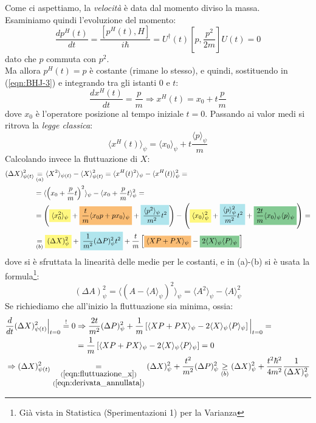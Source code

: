 \documentclass[../../FisicaTeorica.tex]{subfiles}
\begin{document}
Come ci aspettiamo, la \textit{velocità} è data dal momento diviso la massa.\\
Esaminiamo quindi l'evoluzione del momento:
\[
\frac{dp^H(t)}{dt}=\frac{[p^H(t),H]}{i\hbar}=U^\dag(t)\left[p,\frac{p^2}{2m}\right]U(t)=0
\]
dato che $p$ commuta con $p^2$.\\
Ma allora $p^H(t)=p$ è costante (rimane lo stesso), e quindi, sostituendo in (\ref{eqn:BHJ-3}) e integrando tra gli istanti $0$ e $t$:
\[
\frac{dx^H(t)}{dt}=\frac{p}{m}\Rightarrow x^H(t)=x_0+t\frac{p}{m}
\]
dove $x_0$ è l'operatore posizione al tempo iniziale $t=0$. Passando ai valor medi si ritrova la \textit{legge classica}:
\[
\langle x^H(t)\rangle_\psi = \langle x_0\rangle_\psi + t \frac{\langle p\rangle_\psi}{m}
\]
Calcolando invece la fluttuazione di $X$:
\begin{align}
\nonumber
(\Delta X)^2_{\psi(t)} &\underset{(a)}{=} \langle X^2\rangle_{\psi(t)}-\langle X\rangle_{\psi(t)}^2 =\langle x^H(t)^2\rangle_\psi-\langle x^H(t)\rangle_\psi^2 =\\
&=\langle \left(x_0+\frac{p}{m}t\right)^2\rangle_\psi-\langle x_0+\frac{p}{m}t\rangle^2_\psi =\nonumber \\
&= \nonumber
\left(
\hlc{Yellow}{\langle x_0^2\rangle_\psi} + \hlc{BurntOrange}{\frac{t}{m}\langle x_0p + px_0\rangle_\psi} 
+ \hlc{SkyBlue}{\frac{\langle p^2 \rangle_\psi}{m^2} t^2} \right)
-\left(
\hlc{Yellow}{\langle x_0\rangle_\psi^2} + \hlc{SkyBlue}{\frac{\langle p\rangle_\psi^2}{m^2}t^2} 
+ \hlc{ForestGreen}{\frac{2t}{m}\langle x_0\rangle_\psi\langle p\rangle_\psi}\right) =\\
&\underset{(b)}{=} \hlc{Yellow}{(\Delta X)^2_\psi} + \hlc{SkyBlue}{\frac{1}{m^2}(\Delta P)^2_\psi t^2} +
\frac{t}{m}\left [\hlc{BurntOrange}{\langle XP+PX\rangle_\psi}-\hlc{ForestGreen}{2\langle X\rangle_\psi\langle P\rangle_\psi}\right ]
\label{eqn:fluttuazione_x}
\end{align}
dove si è sfruttata la linearità delle medie per  le costanti, e in (a)-(b) si è usata la formula\footnote{Già vista in Statistica (Sperimentazioni 1) per la Varianza}:
\[
(\Delta A)^2_\psi = \langle(A-\langle A\rangle_\psi)^2\rangle_\psi =\langle A^2\rangle_\psi-\langle A\rangle_\psi^2
\]
Se richiediamo che all'inizio la fluttuazione sia minima, ossia:
\begin{align}
\frac{d}{dt}(\Delta X)^2_{\psi(t)}\Big|_{t=0}\overset{!}{=}0 &\Rightarrow 
\frac{2t}{m^2}(\Delta P)^2_\psi + \frac{1}{m}\left[
\langle XP + PX\rangle_\psi - 2\langle X\rangle_\psi \langle P\rangle_\psi
\right]\Big|_{t=0} =\nonumber \\
&= \frac{1}{m}\left[
\langle XP + PX\rangle_\psi - 2\langle X\rangle_\psi \langle P\rangle_\psi
\right] = 0
\label{eqn:derivata_annullata}
\\
\nonumber
\span \Rightarrow (\Delta X)^2_{\psi(t)} \underset{\substack{(\ref{eqn:fluttuazione_x})\\(\ref{eqn:derivata_annullata})}}{=} (\Delta X)^2_\psi + \frac{t^2}{m^2}(\Delta P)^2_\psi \underset{(b)}{\geq} (\Delta X)^2_\psi + \frac{t^2 \hbar^2}{4m^2} \frac{1}{(\Delta X)^2_\psi}
\end{align}
\end{document}
